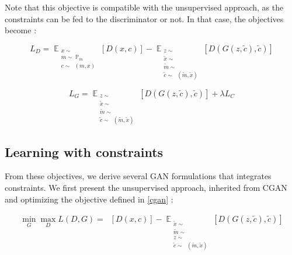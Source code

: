 \documentclass{article}
\begin{document}
	Note that this objective is compatible with the unsupervised approach, as the constraints can be fed to the discriminator or not. In that case, the objectives become :
	
	\begin{equation}
	L_{D} =  \mathop{\mathbb{E}}_{\substack{
			x\sim \mathop{\mathbb{P}_r}\\	
			m \sim \mathop{\mathbb{P}}_{m}\\
			c \sim \mathop{\mathbb{{P}}_{c}}(m, x)}}
	[D(x, c)] - \mathop{\mathbb{{E}}}_{\substack{
			z \sim \mathop{\mathbb{{P}}_{z}} \\
			\tilde{x} \sim \mathop{\mathbb{{P}}_{r}} \\
			\tilde{m} \sim \mathop{\mathbb{{P}}_{m} }\\
			\tilde{c} \sim \mathop{\mathbb{{P}}_{c}}(\tilde{m}, \tilde{x})
	}} [D(G(z, \tilde{c}), \tilde{c})] 
	\end{equation}
	
	
	\begin{equation}
	L_{G} =  \mathop{\mathbb{{E}}}_{\substack{
			z \sim \mathop{\mathbb{{P}}_{z}} \\
			\tilde{x} \sim \mathop{\mathbb{{P}}_{r}} \\
			\tilde{m} \sim \mathop{\mathbb{{P}}_{m} }\\
			\tilde{c} \sim \mathop{\mathbb{{P}}_{c}}(\tilde{m}, \tilde{x})
	}} [D(G(z, \tilde{c}), \tilde{c})]  + \lambda L_C
	\end{equation}
	
	
	\subsection{Learning with constraints}
	
	From these objectives, we derive several GAN formulations that integrates constraints. 	We first present the unsupervised approach, inherited from CGAN and optimizing the objective defined in \eqref{cgan} :
	
	\begin{align}
	\min_G \max_D  L(D, G) = \mathop{\mathbb{{E}}_{\substack{
				x \sim \mathop{\mathbb{{P}}_{r}} \\
				m \sim \mathop{\mathbb{{P}}_{m}}\\
				c \sim \mathop{\mathbb{{P}}_{c}}(m, x)
	}}} [D(x, c)] 
	- \mathop{\mathbb{{E}}}_{\substack{
			\tilde{x} \sim \mathop{\mathbb{{P}}_{r}} \\
			\tilde{m} \sim \mathop{\mathbb{{P}}_{m} }\\
			z \sim \mathop{\mathbb{{P}}_{z} }\\
			\tilde{c} \sim \mathop{\mathbb{{P}}_{c}}(\tilde{m}, \tilde{x})
	}} [D(G(z, \tilde{c}), \tilde{c})] 
	\end{align}
	
\end{document}
